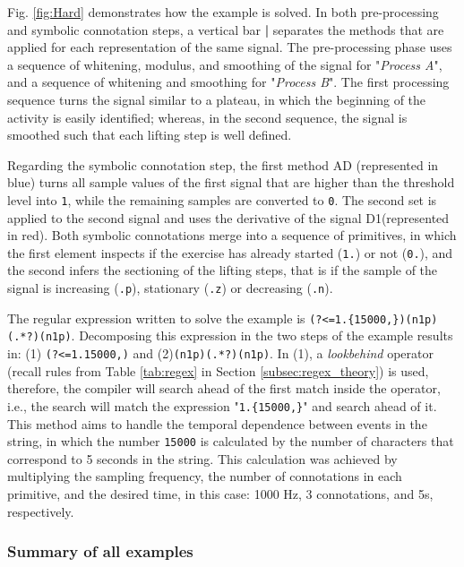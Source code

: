 Fig. \ref{fig:Hard} demonstrates how the example is solved. In both pre-processing and symbolic connotation steps, a vertical bar \textbf{|} separates the methods that are applied for each representation of the same signal. The pre-processing phase uses a sequence of whitening, modulus, and smoothing of the signal for "\textit{Process A}", and a sequence of whitening and smoothing for "\textit{Process B}". The first processing sequence turns the signal similar to a plateau, in which the beginning of the activity is easily identified; whereas, in the second sequence, the signal is smoothed such that each lifting step is well defined.
\par
Regarding the symbolic connotation step, the first method AD (represented in blue) turns all sample values of the first signal that are higher than the threshold level into \texttt{1}, while the remaining samples are converted to \texttt{0}. The second set is applied to the second signal and uses the derivative of the signal D1(represented in red). Both symbolic connotations merge into a sequence of primitives, in which the first element inspects if the exercise has already started (\texttt{1.})  or not (\texttt{0.}), and the second infers the sectioning of the lifting steps, that is if the sample of the signal is increasing (\texttt{.p}), stationary (\texttt{.z}) or decreasing (\texttt{.n}).
\par
The regular expression written to solve the example is \texttt{(?<=1.\{15000,\})(n1p)(.*?)(n1p)}. Decomposing this expression in the two steps of the example results in: (1) \texttt{(?<=1.{15000,})} and (2)\texttt{(n1p)(.*?)(n1p)}. In (1), a \textit{lookbehind} operator (recall rules from Table \ref{tab:regex} in Section \ref{subsec:regex_theory}) is used, therefore, the compiler will search ahead of the first match inside the operator, i.e., the search will match the expression "\texttt{1.\{15000,\}}" and search ahead of it. This method aims to handle the temporal dependence between events in the string, in which the number \texttt{15000} is calculated by the number of characters that correspond to 5 seconds in the string. This calculation was achieved by multiplying the sampling frequency, the number of connotations in each primitive, and the desired time, in this case: 1000 Hz, 3 connotations, and 5s, respectively.

\subsubsection{Summary of all examples}

